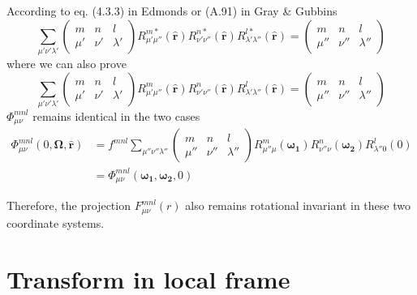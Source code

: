 According to eq. (4.3.3) in Edmonds \citep{Edmonds} or (A.91) in
Gray & Gubbins \citep{Gray-Gubbins}
\begin{equation}
\sum_{\mu'\nu'\lambda'}\left(\begin{array}{ccc}
m & n & l\\
\mu' & \nu' & \lambda'
\end{array}\right)R_{\mu'\mu''}^{m*}(\mathbf{\hat{r}})R_{\nu'\nu''}^{n*}(\mathbf{\hat{r}})R_{\lambda'\lambda''}^{l*}(\mathbf{\hat{r}})=\left(\begin{array}{ccc}
m & n & l\\
\mu'' & \nu'' & \lambda''
\end{array}\right)
\end{equation}
where we can also prove
\begin{equation}
\sum_{\mu'\nu'\lambda'}\left(\begin{array}{ccc}
m & n & l\\
\mu' & \nu' & \lambda'
\end{array}\right)R_{\mu'\mu''}^{m}(\mathbf{\hat{r}})R_{\nu'\nu''}^{n}(\mathbf{\hat{r}})R_{\lambda'\lambda''}^{l}(\mathbf{\hat{r}})=\left(\begin{array}{ccc}
m & n & l\\
\mu'' & \nu'' & \lambda''
\end{array}\right)
\end{equation}
$\Phi_{\mu\nu}^{mnl}$ remains identical in the two cases
\begin{align}
\Phi_{\mu\nu}^{mnl}(0,\mathbf{\Omega},\mathbf{\hat{r}}) & =f^{mnl}\sum_{\mu''\nu''\lambda''}\left(\begin{array}{ccc}
m & n & l\\
\mu'' & \nu'' & \lambda''
\end{array}\right)R_{\mu''\mu}^{m}(\boldsymbol{\omega_{1}})R_{\nu''\nu}^{n}(\boldsymbol{\omega_{2}})R_{\lambda''0}^{l}(0)\nonumber \\
 & =\Phi_{\mu\nu}^{mnl}(\boldsymbol{\omega_{1}},\boldsymbol{\omega_{2}},0)
\end{align}


Therefore, the projection $F_{\mu\nu}^{mnl}(r)$ also remains rotational
invariant in these two coordinate systems.


\section{Transform in local frame}

